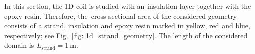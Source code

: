 In this section, the 1D coil is studied with an insulation layer together with the epoxy resin. Therefore, the~cross-sectional area of the considered geometry consists of a strand, insulation and epoxy resin marked in yellow, red and blue, respectively; see Fig.~\ref{fig: 1d_strand_geometry}. The length of the considered domain is $L_\text{strand}=1~\text{m}$.